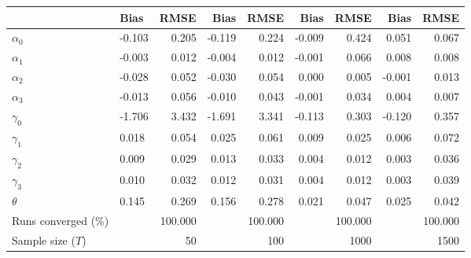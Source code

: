 
\begin{tabular}[t]{llrrrrrrr}
\toprule
  & Bias & RMSE & Bias & RMSE & Bias & RMSE & Bias & RMSE\\
\midrule
$\alpha_{0}$ & -0.103 & 0.205 & -0.119 & 0.224 & -0.009 & 0.424 & 0.051 & 0.067\\
$\alpha_{1}$ & -0.003 & 0.012 & -0.004 & 0.012 & -0.001 & 0.066 & 0.008 & 0.008\\
$\alpha_{2}$ & -0.028 & 0.052 & -0.030 & 0.054 & 0.000 & 0.005 & -0.001 & 0.013\\
$\alpha_{3}$ & -0.013 & 0.056 & -0.010 & 0.043 & -0.001 & 0.034 & 0.004 & 0.007\\
$\gamma_{0}$ & -1.706 & 3.432 & -1.691 & 3.341 & -0.113 & 0.303 & -0.120 & 0.357\\
$\gamma_{1}$ & 0.018 & 0.054 & 0.025 & 0.061 & 0.009 & 0.025 & 0.006 & 0.072\\
$\gamma_{2}$ & 0.009 & 0.029 & 0.013 & 0.033 & 0.004 & 0.012 & 0.003 & 0.036\\
$\gamma_{3}$ & 0.010 & 0.032 & 0.012 & 0.031 & 0.004 & 0.012 & 0.003 & 0.039\\
$\theta$ & 0.145 & 0.269 & 0.156 & 0.278 & 0.021 & 0.047 & 0.025 & 0.042\\
Runs converged (\%) &  & 100.000 &  & 100.000 &  & 100.000 &  & 100.000\\
Sample size ($T$) &  & 50 &  & 100 &  & 1000 &  & 1500\\
\bottomrule
\end{tabular}
